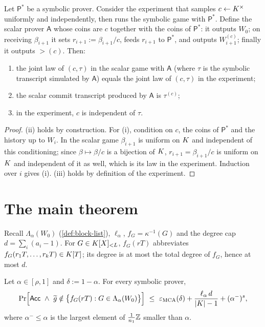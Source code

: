 \begin{lemma}[Coupling]\label{lem:coupling}
Let $\mathsf P^\ast$ be a symbolic prover. Consider the experiment that samples
$c\leftarrow K^\times$ uniformly and independently, then runs the symbolic game with
$\mathsf P^\ast$. Define the scalar prover $\mathsf A$ whose coins are $c$ together with
the coins of $\mathsf P^\ast$: it outputs $W_0$; on receiving $\beta_{i+1}$ it sets
$r_{i+1}:=\beta_{i+1}/c$, feeds $r_{i+1}$ to $\mathsf P^\ast$, and outputs
$W_{i+1}^{(c)}$; finally it outputs $\gt(c)$. Then:
\begin{enumerate}[label=\textup{(\roman*)}]
\item the joint law of $(c,\tau)$ in the scalar game with $\mathsf A$ (where $\tau$ is the
symbolic transcript simulated by $\mathsf A$) equals the joint law of $(c,\tau)$ in the
experiment;
\item the scalar commit transcript produced by $\mathsf A$ is $\tau^{(c)}$;
\item in the experiment, $c$ is independent of $\tau$.
\end{enumerate}
\end{lemma}

\begin{proof}
(ii) holds by construction. For (i), condition on $c$, the coins of $\mathsf P^\ast$ and
the history up to $W_i$. In the scalar game $\beta_{i+1}$ is uniform on $K$ and
independent of this conditioning; since $\beta\mapsto\beta/c$ is a bijection of $K$,
$r_{i+1}=\beta_{i+1}/c$ is uniform on $K$ and independent of it as well, which is its law
in the experiment. Induction over $i$ gives (i). (iii) holds by definition of the
experiment.
\end{proof}

\section{The main theorem}

Recall $\Lambda_\alpha(W_0)$ (\cref{def:block-list}), $\ell_\alpha$, $f_G=\kappa^{-1}(G)$
and the degree cap $d=\sum_i(a_i-1)$. For $G\in K[X]_{<L}$, $f_G(rT)$ abbreviates
$f_G(r_1T,\dots,r_kT)\in K[T]$; its degree is at most the total degree of $f_G$, hence at
most $d$.

\begin{theorem}\label{thm:symbolic-list}
Let $\alpha\in[\rho,1]$ and $\delta:=1-\alpha$. For every symbolic prover,
\[
\Pr\Bigl[\Acc\ \wedge\ \gt\notin\bigl\{f_G(rT):G\in\Lambda_\alpha(W_0)\bigr\}\Bigr]
\ \le\ \eps_{\MCA}(\delta)+\frac{\ell_\alpha\,d}{|\K|-1}+(\alpha^-)^{s},
\]
where $\alpha^-\le\alpha$ is the largest element of $\frac1{n_1}\mathbb{Z}$ smaller than $\alpha$.
\end{theorem}

